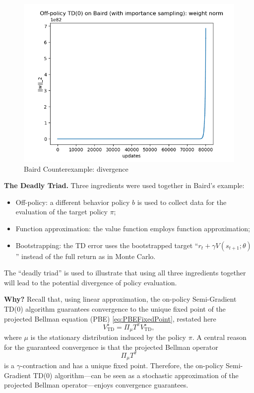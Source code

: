 \documentclass[
]{book}
\theoremstyle{definition}
\theoremstyle{definition}
\theoremstyle{definition}
\theoremstyle{definition}
\theoremstyle{remark}
\begin{document}
\begin{figure}

{\centering \includegraphics[width=0.6\linewidth]{images/Value-RL/Baird-w} 

}

\caption{Baird Counterexample: divergence}\label{fig:Baird-example-value}
\end{figure}

\textbf{The Deadly Triad.} Three ingredients were used together in Baird's example:

\begin{itemize}
\item
  Off-policy: a different behavior policy \(b\) is used to collect data for the evaluation of the target policy \(\pi\);
\item
  Function approximation: the value function employs function approximation;
\item
  Bootstrapping: the TD error uses the bootstrapped target ``\(r_t + \gamma V(s_{t+1}; \theta)\)'' instead of the full return as in Monte Carlo.
\end{itemize}

The ``deadly triad'' is used to illustrate that using all three ingredients together will lead to the potential divergence of policy evaluation.

\textbf{Why?} Recall that, using linear approximation, the on-policy Semi-Gradient TD(0) algorithm guarantees convergence to the unique fixed point of the projected Bellman equation (PBE) \eqref{eq:PBEFixedPoint}, restated here
\[
V^\star_{\text{TD}} = \Pi_{\mu} T^\pi V^\star_{\text{TD}},
\]
where \(\mu\) is the stationary distribution induced by the policy \(\pi\).
A central reason for the guaranteed convergence is that the projected Bellman operator
\[
\Pi_{\mu} T^\pi
\]
is a \(\gamma\)-contraction and has a unique fixed point. Therefore, the on-policy Semi-Gradient TD(0) algorithm---can be seen as a stochastic approximation of the projected Bellman operator---enjoys convergence guarantees.
\end{document}
